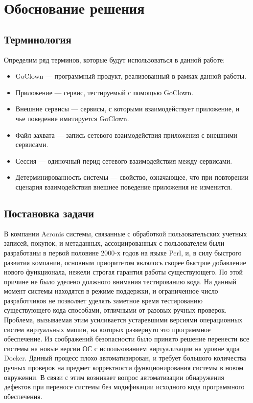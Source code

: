 \section{Обоснование решения}
\subsection{Терминология}
Определим ряд терминов, которые будут использоваться в данной работе:
\begin{itemize}
    \item GoClown --- программный продукт, реализованный в рамках данной работы.  
    \item Приложение --- сервис, тестируемый с помощью GoClown.  
    \item Внешние сервисы --- сервисы, с которыми взаимодействует приложение,
        и чье поведение имитируется GoClown.  
    \item Файл захвата --- запись сетевого взаимодействия приложения с внешними
        сервисами.  
    \item Сессия --- одиночный перид сетевого взаимодействия между сервисами.  
    \item Детерминированность системы --- свойство, означающее, что при
        повторении сценария взаимодействия внешнее поведение приложения
        не изменится.  
\end{itemize}

\subsection{Постановка задачи}
В компании Acronis системы, связанные с обработкой пользовательских учетных
записей, покупок, и метаданных, ассоциированных с пользователем были разработаны
в первой половине 2000-х годов на языке Perl, и, в силу быстрого развития
компании, основным приоритетом являлось скорее быстрое добавление нового
функционала, нежели строгая гарантия работы существующего. По этой причине не
было уделено должного внимания тестированию кода. На данный момент системы
находятся в режиме поддержки, и ограниченное число разработчиков не позволяет
уделять заметное время тестированию существующего кода способами, отличными от
разовых ручных проверок. Проблема, вызываемая этим усиливается устаревшими
версиями операционных систем виртуальных машин, на которых развернуто это
программное обеспечение. Из соображений безопасности было принято решение
перенести все системы на новые версии ОС с использованием виртуализации на
уровне ядра Docker. Данный процесс плохо автоматизирован, и требует большого
количества ручных проверок на предмет корректности функционирования системы
в новом окружении. В связи с этим возникает вопрос автоматизации обнаружения
дефектов при переносе системы без модификации исходного кода программного
обеспечения.

